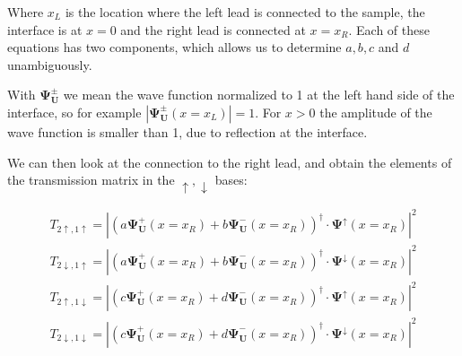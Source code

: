 \documentclass[11pt]{article}
\begin{document}
Where $x_L$ is the location where the left lead is connected to the sample, the
interface is at $x = 0$ and the right lead is connected at $x = x_R$.
Each of these equations has two components, which allows us to determine
$a, b, c$ and $d$ unambiguously.

With $\mathbf{\Psi^\pm_U}$ we mean the wave function normalized to 1 at the
left hand side of the interface, so for example
$|\mathbf{\Psi^\pm_U}(x=x_L)|=1$. For $x>0$ the amplitude of the wave function
is smaller than 1, due to reflection at the interface.

We can then look at the connection to the right lead, and obtain the 
elements of the transmission matrix in the $\uparrow, \downarrow$ bases:

\begin{align}
    T_{2\uparrow,1\uparrow} = \left| \left( 
        a \mathbf{\Psi^+_U}(x=x_R) + b  \mathbf{\Psi^-_U}(x=x_R)
    \right)^\dagger \cdot \mathbf{\Psi}^\uparrow(x=x_R) \right|^2\\
    T_{2\downarrow,1\uparrow} = \left| \left( 
        a \mathbf{\Psi^+_U}(x=x_R) + b  \mathbf{\Psi^-_U}(x=x_R)
    \right)^\dagger \cdot \mathbf{\Psi}^\downarrow(x=x_R) \right|^2\\
    T_{2\uparrow,1\downarrow} = \left| \left( 
        c \mathbf{\Psi^+_U}(x=x_R) + d  \mathbf{\Psi^-_U}(x=x_R)
    \right)^\dagger \cdot \mathbf{\Psi}^\uparrow(x=x_R) \right|^2\\
    T_{2\downarrow,1\downarrow} = \left| \left( 
        c \mathbf{\Psi^+_U}(x=x_R) + d  \mathbf{\Psi^-_U}(x=x_R)
    \right)^\dagger \cdot \mathbf{\Psi}^\downarrow(x=x_R) \right|^2
\end{align}
\end{document}
